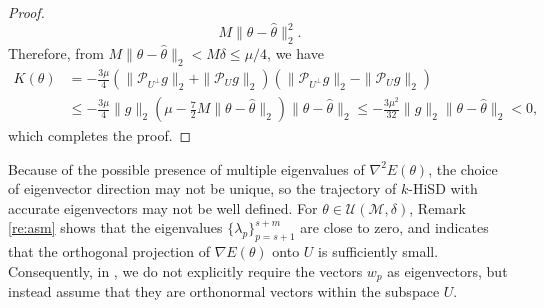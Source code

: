\documentclass[final]{siamart251216}
\begin{document}
\begin{proof}
\begin{equation}
M\|\theta-\hat\theta\|_2^2.
\end{equation}
Therefore, from $M\|\theta-\hat\theta\|_2<M\delta\leqslant \mu/4$, we have
\begin{equation}\label{eqn:kest}
\begin{aligned}
K(\theta) & = -\frac{3\mu}{4}
\left(\|\mathcal{P}_{U^\perp}g\|_2 + \|\mathcal{P}_{U}g\|_2\right)
\left(\|\mathcal{P}_{U^\perp}g\|_2 - \|\mathcal{P}_{U}g\|_2\right) \\
&\leqslant -\frac{3\mu}{4}\|g\|_2 
\left(\mu-\frac{7}{2}M\|\theta-\hat\theta\|_2\right)
\|\theta-\hat\theta\|_2 
\leqslant -\frac{3\mu^2}{32}\|g\|_2 
\|\theta-\hat\theta\|_2 <0,
\end{aligned}
\end{equation}
which completes the proof. 
\end{proof}

\begin{remark}
Because of the possible presence of multiple eigenvalues of $\nabla^2 E(\theta)$, the choice of eigenvector direction may not be unique, so the trajectory of $k$-HiSD with accurate eigenvectors may not be well defined. 
For $\theta \in \mathcal{U}(\mathcal{M},\delta)$, Remark \ref{re:asm} shows that the eigenvalues $\{\lambda_p\}_{p=s+1}^{s+m}$ are close to zero, and  indicates that the orthogonal projection of $\nabla E(\theta)$ onto $U$ is sufficiently small. 
Consequently, in , we do not explicitly require the vectors $w_p$ as eigenvectors, but instead assume that they are orthonormal vectors within the subspace $U$. 
\end{remark}
\end{document}
